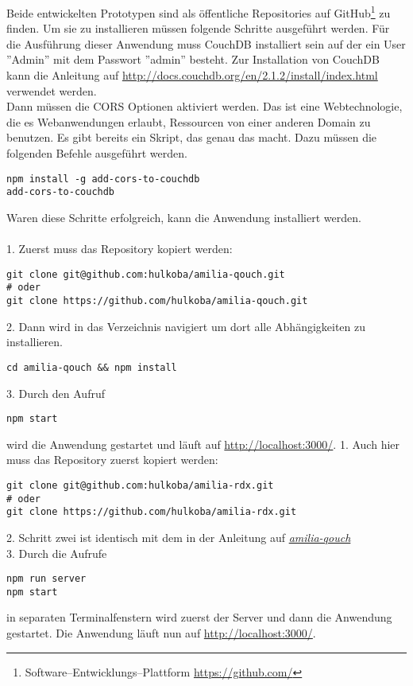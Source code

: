 Beide entwickelten Prototypen sind als öffentliche Repositories auf GitHub\footnote{Software--Entwicklungs--Plattform \url{https://github.com/}} zu finden. 
Um sie zu installieren müssen folgende Schritte ausgeführt werden.
%
%
Für die Ausführung dieser Anwendung muss CouchDB installiert sein auf der ein User ''Admin'' mit dem Passwort ''admin'' besteht.
Zur Installation von CouchDB kann die Anleitung auf \url{http://docs.couchdb.org/en/2.1.2/install/index.html} verwendet werden.\\
Dann müssen die \gls{CORS} Optionen aktiviert werden.
Das ist eine Webtechnologie, die es Webanwendungen erlaubt, Ressourcen von einer anderen Domain zu benutzen.
Es gibt bereits ein Skript, das genau das macht. Dazu müssen die folgenden Befehle ausgeführt werden.
%
\begin{lstlisting}
npm install -g add-cors-to-couchdb
add-cors-to-couchdb
\end{lstlisting}
%
Waren diese Schritte erfolgreich, kann die Anwendung installiert werden.\\\\
1. Zuerst muss das Repository kopiert werden:
\begin{lstlisting}
git clone git@github.com:hulkoba/amilia-qouch.git
# oder
git clone https://github.com/hulkoba/amilia-qouch.git
\end{lstlisting}
2. Dann wird in das Verzeichnis navigiert um dort alle Abhängigkeiten zu installieren.
\begin{lstlisting}
cd amilia-qouch && npm install
\end{lstlisting}
3. Durch den Aufruf
\begin{lstlisting}
npm start
\end{lstlisting}
wird die Anwendung gestartet und läuft auf \url{http://localhost:3000/}.
%
%
%
1. Auch hier muss das Repository zuerst kopiert werden:
\begin{lstlisting}
git clone git@github.com:hulkoba/amilia-rdx.git
# oder
git clone https://github.com/hulkoba/amilia-rdx.git
\end{lstlisting}
2. Schritt zwei ist identisch mit dem in der Anleitung auf \hyperref[chap:install:qouch]{\it{amilia-qouch}}\\
3. Durch die Aufrufe
\begin{lstlisting}
npm run server
npm start
\end{lstlisting}
in separaten Terminalfenstern wird zuerst der Server und dann die Anwendung gestartet.
Die Anwendung läuft nun auf \url{http://localhost:3000/}.